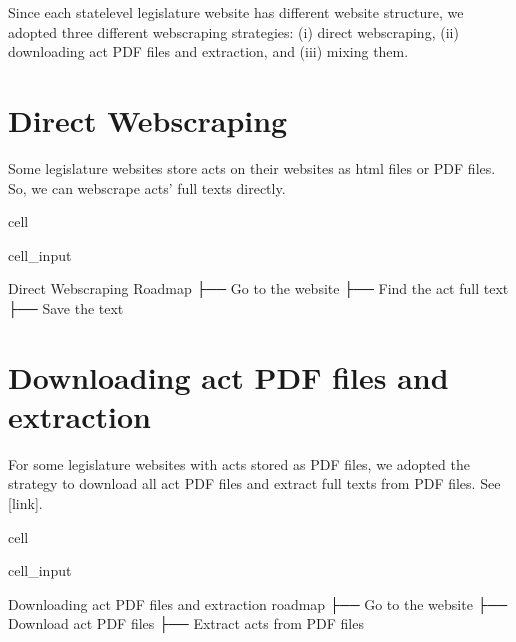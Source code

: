 \documentclass[letterpaper,10pt,english]{jupyterBook}
\begin{document}
\sphinxAtStartPar
Since each state\sphinxhyphen{}level legislature website has different website structure, we adopted three different webscraping strategies: (i) direct webscraping, (ii) downloading act PDF files and extraction, and (iii) mixing them.


\section{Direct Webscraping}
\label{\detokenize{ch2:direct-webscraping}}
\sphinxAtStartPar
Some legislature websites store acts on their websites as html files or PDF files. So, we can webscrape acts’ full texts directly.

\sphinxAtStartPar
{}

\begin{sphinxuseclass}{cell}\begin{sphinxVerbatimInput}

\begin{sphinxuseclass}{cell_input}
\begin{sphinxVerbatim}[commandchars=\\\{\}]
\PYGZdl{} Direct Webscraping Roadmap
├── Go to the website
├── Find the act full text
├── Save the text
\end{sphinxVerbatim}

\end{sphinxuseclass}\end{sphinxVerbatimInput}

\end{sphinxuseclass}

\section{Downloading act PDF files and extraction}
\label{\detokenize{ch2:downloading-act-pdf-files-and-extraction}}
\sphinxAtStartPar
For some legislature websites with acts stored as PDF files, we adopted the strategy to download all act PDF files and extract full texts from PDF files. See {[}link{]}.

\begin{sphinxuseclass}{cell}\begin{sphinxVerbatimInput}

\begin{sphinxuseclass}{cell_input}
\begin{sphinxVerbatim}[commandchars=\\\{\}]
\PYGZdl{} Downloading act PDF files and extraction roadmap
├── Go to the website
├── Download act PDF files
├── Extract acts from PDF files
\end{sphinxVerbatim}

\end{sphinxuseclass}\end{sphinxVerbatimInput}

\end{sphinxuseclass}
\sphinxAtStartPar
{}
\end{document}
